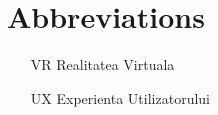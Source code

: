 \section*{Abbreviations}

\begin{itemize}[leftmargin=2cm, topsep=0pt, partopsep=5pt,itemsep=0pt,parsep=0pt]
\item[VR] Realitatea Virtuala
\item[UX] Experienta Utilizatorului

\end{itemize}